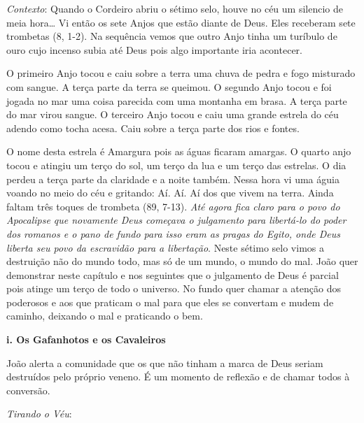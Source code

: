 \documentclass[
]{book}
\begin{document}
\emph{Contexto}: Quando o Cordeiro abriu o sétimo selo, houve no céu um silencio de meia hora\ldots{} Vi então os sete Anjos que estão diante de Deus. Eles receberam sete trombetas (8, 1-2). Na sequência vemos que outro Anjo tinha um turíbulo de ouro cujo incenso subia até Deus pois algo importante iria acontecer.

O primeiro Anjo tocou e caiu sobre a terra uma chuva de pedra e fogo misturado com sangue. A terça parte da terra se queimou. O segundo Anjo tocou e foi jogada no mar uma coisa parecida com uma montanha em brasa. A terça parte do mar virou sangue. O terceiro Anjo tocou e caiu uma grande estrela do céu adendo como tocha acesa. Caiu sobre a terça parte dos rios e fontes.

O nome desta estrela é Amargura pois as águas ficaram amargas. O quarto anjo tocou e atingiu um terço do sol, um terço da lua e um terço das estrelas. O dia perdeu a terça parte da claridade e a noite também. Nessa hora vi uma águia voando no meio do céu e gritando: Aí. Aí. Aí dos que vivem na terra. Ainda faltam três toques de trombeta (89, 7-13). \emph{Até agora fica claro para o povo do Apocalipse que novamente Deus começava o julgamento para libertá-lo do poder dos romanos e o pano de fundo para isso eram as pragas do Egito, onde Deus liberta seu povo da escravidão para a libertação}. Neste sétimo selo vimos a destruição não do mundo todo, mas só de um mundo, o mundo do mal. João quer demonstrar neste capítulo e nos seguintes que o julgamento de Deus é parcial pois atinge um terço de todo o universo. No fundo quer chamar a atenção dos poderosos e aos que praticam o mal para que eles se convertam e mudem de caminho, deixando o mal e praticando o bem.

\textbf{i. Os Gafanhotos e os Cavaleiros}

João alerta a comunidade que os que não tinham a marca de Deus seriam destruídos pelo próprio veneno. É um momento de reflexão e de chamar todos à conversão.

\emph{Tirando o Véu}:
\end{document}
